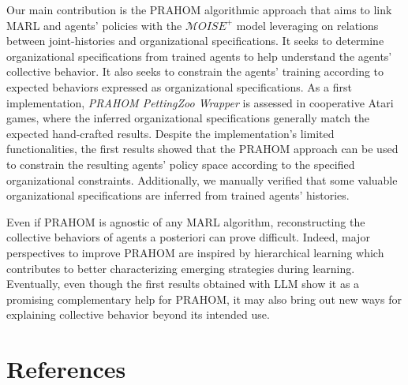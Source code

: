 \documentclass[runningheads]{llncs}
\newcounter{relation}
\newcounter{proof}
\begin{document}


Our main contribution is the PRAHOM algorithmic approach that aims to link MARL and agents' policies with the $\mathcal{M}OISE^+$ model leveraging on relations between joint-histories and organizational specifications. It seeks to determine organizational specifications from trained agents to help understand the agents' collective behavior. It also seeks to constrain the agents' training according to expected behaviors expressed as organizational specifications.
As a first implementation, \emph{PRAHOM PettingZoo Wrapper} is assessed in cooperative Atari games, where the inferred organizational specifications generally match the expected hand-crafted results.
Despite the implementation's limited functionalities, the first results showed that the PRAHOM approach can be used to constrain the resulting agents' policy space according to the specified organizational constraints. Additionally, we manually verified that some valuable organizational specifications are inferred from trained agents' histories.

Even if PRAHOM is agnostic of any MARL algorithm, reconstructing the collective behaviors of agents a posteriori can prove difficult. Indeed, major perspectives to improve PRAHOM are inspired by hierarchical learning which contributes to better characterizing emerging strategies during learning.
Eventually, even though the first results obtained with LLM show it as a promising complementary help for PRAHOM, it may also bring out new ways for explaining collective behavior beyond its intended use.


\section*{References}




\end{document}

